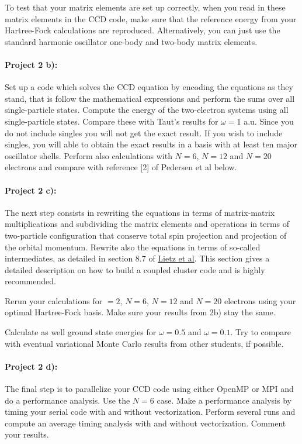 \documentclass[%
oneside,                 %
final,                   %
10pt]{article}
\begin{document}
To test that your matrix elements are set up correctly, when you read in these matrix elements in the CCD code, make sure that the reference energy from your Hartree-Fock calculations are reproduced. Alternatively, you can just use the standard harmonic oscillator one-body and two-body matrix elements.

\paragraph{Project 2 b):}
Set up a code which solves the CCD equation by encoding the equations as they stand, that is follow the mathematical expressions and perform the sums over all single-particle states.  Compute the energy of the two-electron systems using 
all single-particle states. Compare these with Taut's results for $\omega=1$ a.u.  Since you do not include singles you will not get the exact result. If you wish to include singles, you will able to obtain the exact results in a basis with at least ten major oscillator shells.  
Perform also calculations with $N=6$, $N=12$ and $N=20$ electrons and compare with reference [2] of Pedersen et al below.

\paragraph{Project 2 c):}
The next step consists in rewriting the equations in terms of matrix-matrix multiplications and subdividing 
the matrix elements and operations in terms of two-particle configuration that conserve total spin projection and projection of the orbital momentum. Rewrite also the equations in terms of so-called intermediates, as detailed 
in section 8.7 of \href{{https://github.com/ManyBodyPhysics/LectureNotesPhysics/blob/master/doc/src/lnp.pdf}}{Lietz et al}.
This section gives a detailed description on how to build a coupled cluster code and is highly recommended. 

Rerun your calculations for $=2$, $N=6$, $N=12$ and $N=20$ electrons using your optimal Hartree-Fock basis. Make sure your results from 2b) stay the same. 

Calculate as well ground state energies for $\omega=0.5$ and $\omega=0.1$. Try to compare with eventual variational
Monte Carlo results from other students, if possible. 

\paragraph{Project 2 d):}
The final step is to parallelize your CCD code using either OpenMP or MPI and do a performance analysis. Use the $N=6$ case. Make a performance analysis by timing your serial code
with and without vectorization. Perform several runs and compute an average timing analysis
with and without vectorization. Comment your results. 
\end{document}
